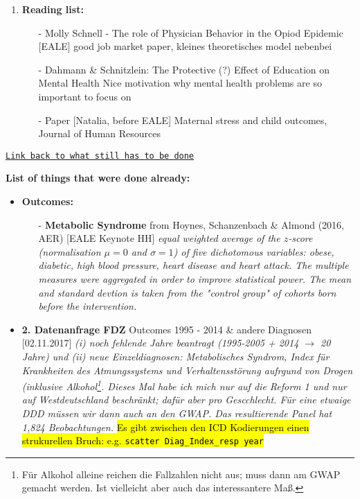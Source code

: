 \documentclass[11pt,a4paper]{article}
\begin{document}
{\begin{enumerate}
\item \textbf{Reading list:}
\begin{itemize}
	\item[-] Molly Schnell - The role of Physician Behavior in the Opiod Epidemic [EALE]\newline
	good job market paper, kleines theoretisches model nebenbei
	\item[-]  Dahmann \& Schnitzlein: The Protective (?) Effect of Education on Mental Health   \newline
 	Nice motivation why mental health problems are so important to focus on 
 	\item[-] Paper [Natalia, before EALE] Maternal stress and child outcomes, Journal of Human Resources
\end{itemize}
\end{enumerate}




\newpage
\hfill{\hyperlink{TODO}{\Large{\texttt{Link back to what still has to be done}}}
\bigskip

\label{DONE}
\textbf{List of things that were done already: }
\begin{itemize}
\item \textbf{Outcomes: }\vspace{-1em}
	\begin{itemize}
	\item[-]\textbf{Metabolic Syndrome}  from Hoynes, Schanzenbach \& Almond (2016, AER) [EALE Keynote HH]\newline
	\textit{
	equal weighted average of the $z$-score (normalisation $\mu=0$ and $\sigma=1$) of five dichotomous variables: obese, diabetic, high blood pressure, heart disease and heart attack. The multiple measures were aggregated in order to improve statistical power. The mean and standard devtion is taken from the "control group" of cohorts born before the intervention.}
	\end{itemize}

\item \textbf{2. Datenanfrage FDZ} Outcomes 1995 - 2014 \& andere Diagnosen [02.11.2017]\newline
	\textit{
	(i) noch fehlende Jahre beantragt (1995-2005 + 2014 $\rightarrow$ 20 Jahre) und (ii) neue Einzeldiagnosen: Metabolisches Syndrom, Index für Krankheiten des Atmungssystems und Verhaltensstörung aufrgund von Drogen (inklusive Alkohol\footnote{Für Alkohol alleine reichen die Fallzahlen nicht aus; muss dann am GWAP gemacht werden. Ist vielleicht aber auch das interessantere Maß.}. Dieses Mal habe ich mich nur auf die Reform 1 und nur auf Westdeutschland beschränkt; dafür aber pro Gescchlecht. Für eine etwaige DDD müssen wir dann auch an den GWAP. Das resultierende Panel hat 1,824 Beobachtungen.}\newline
	\hl{Es gibt zwischen den ICD Kodierungen einen strukurellen Bruch: e.g. \texttt{scatter Diag\_Index\_resp year}} 
	

\end{itemize}}}
\end{document}

